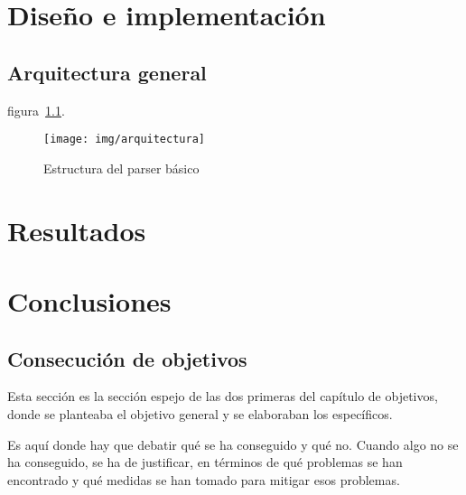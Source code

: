 \documentclass[a4paper, 12pt]{book}
\begin{document}
\cleardoublepage
\chapter{Diseño e implementación}

\section{Arquitectura general} 
\label{sec:arquitectura}

figura~\ref{fig:arquitectura}.

\begin{figure}
  \centering
  \texttt{[image: img/arquitectura]}
  \caption{Estructura del parser básico}
  \label{fig:arquitectura}
\end{figure}



\cleardoublepage
\chapter{Resultados}





\cleardoublepage
\chapter{Conclusiones}
\label{chap:conclusiones}


\section{Consecución de objetivos}
\label{sec:consecucion-objetivos}

Esta sección es la sección espejo de las dos primeras del capítulo de objetivos,
donde se planteaba el objetivo general y se elaboraban los específicos.

Es aquí donde hay que debatir qué se ha conseguido y qué no. Cuando algo no
se ha conseguido, se ha de justificar, en términos de qué problemas se han
encontrado y qué medidas se han tomado para mitigar esos problemas.
\end{document}
